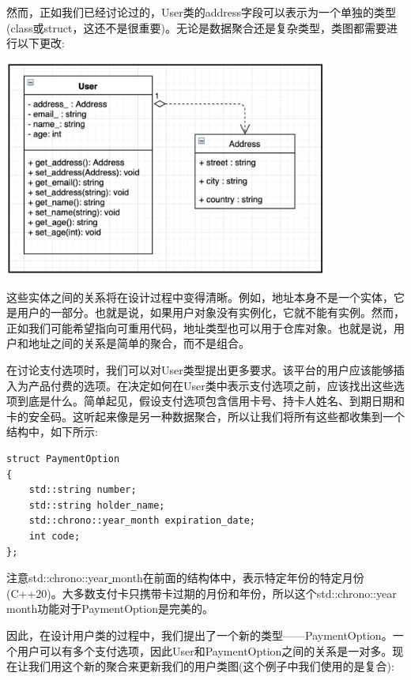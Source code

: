 然而，正如我们已经讨论过的，User类的address字段可以表示为一个单独的类型(class或struct，这还不是很重要)。无论是数据聚合还是复杂类型，类图都需要进行以下更改: \par

\begin{center}
	\includegraphics[width=0.8\textwidth]{content/Section-2/Chapter-10/6}
\end{center}

这些实体之间的关系将在设计过程中变得清晰。例如，地址本身不是一个实体，它是用户的一部分。也就是说，如果用户对象没有实例化，它就不能有实例。然而，正如我们可能希望指向可重用代码，地址类型也可以用于仓库对象。也就是说，用户和地址之间的关系是简单的聚合，而不是组合。 \par
在讨论支付选项时，我们可以对User类型提出更多要求。该平台的用户应该能够插入为产品付费的选项。在决定如何在User类中表示支付选项之前，应该找出这些选项到底是什么。简单起见，假设支付选项包含信用卡号、持卡人姓名、到期日期和卡的安全码。这听起来像是另一种数据聚合，所以让我们将所有这些都收集到一个结构中，如下所示: \par

\begin{lstlisting}[caption={}]
struct PaymentOption
{
	std::string number;
	std::string holder_name;
	std::chrono::year_month expiration_date;
	int code;
};
\end{lstlisting}

注意std::chrono::year\underline{ }month在前面的结构体中，表示特定年份的特定月份(C++20)。大多数支付卡只携带卡过期的月份和年份，所以这个std::chrono::year\underline{ }month功能对于PaymentOption是完美的。 \par
因此，在设计用户类的过程中，我们提出了一个新的类型——PaymentOption。一个用户可以有多个支付选项，因此User和PaymentOption之间的关系是一对多。现在让我们用这个新的聚合来更新我们的用户类图(这个例子中我们使用的是复合): \par

